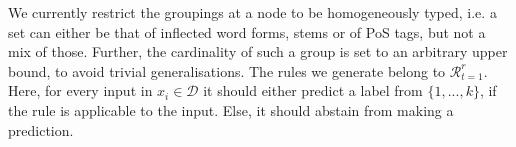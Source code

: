  We currently restrict the groupings at a node to be homogeneously typed, i.e. a set can either be that of inflected word forms, stems or of PoS tags, but not a mix of those. Further, the cardinality of such a group is set to an arbitrary upper bound, to avoid trivial generalisations. The rules we generate belong to $\mathcal{R}_{t=1}^{r}$. Here, for every input in $x_i \in \mathcal{D}$ it should either predict a label from $\{ 1, ..., k \}$, if the rule is applicable to the input. Else, it should abstain from making a prediction. 
























